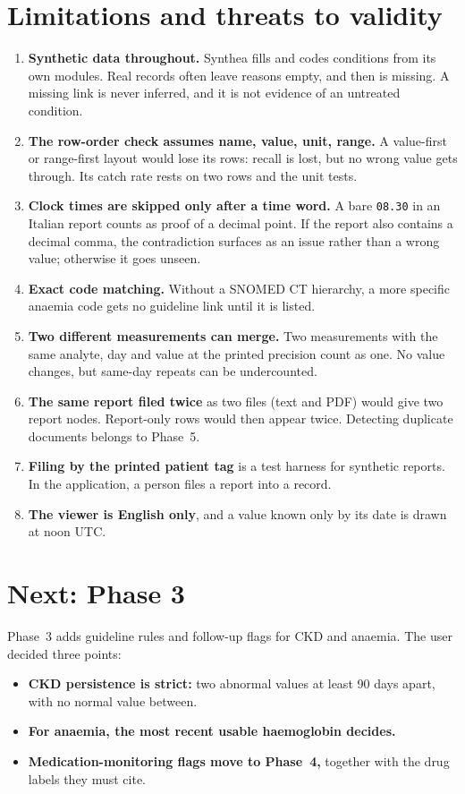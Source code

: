 \documentclass[11pt,a4paper]{article}
\newcommand{\code}[1]{\texttt{\detokenize{#1}}}
\begin{document}
\section{Limitations and threats to validity}
\begin{enumerate}
  \item \textbf{Synthetic data throughout.} Synthea fills \code{reasonReference} and codes conditions from its own modules. Real records often leave reasons empty, and then \code{treated_by} is missing. A missing link is never inferred, and it is not evidence of an untreated condition.
  \item \textbf{The row-order check assumes name, value, unit, range.} A value-first or range-first layout would lose its rows: recall is lost, but no wrong value gets through. Its catch rate rests on two rows and the unit tests.
  \item \textbf{Clock times are skipped only after a time word.} A bare \texttt{08.30} in an Italian report counts as proof of a decimal point. If the report also contains a decimal comma, the contradiction surfaces as an issue rather than a wrong value; otherwise it goes unseen.
  \item \textbf{Exact code matching.} Without a SNOMED CT hierarchy, a more specific anaemia code gets no guideline link until it is listed.
  \item \textbf{Two different measurements can merge.} Two measurements with the same analyte, day and value at the printed precision count as one. No value changes, but same-day repeats can be undercounted.
  \item \textbf{The same report filed twice} as two files (text and PDF) would give two report nodes. Report-only rows would then appear twice. Detecting duplicate documents belongs to Phase~5.
  \item \textbf{Filing by the printed patient tag} is a test harness for synthetic reports. In the application, a person files a report into a record.
  \item \textbf{The viewer is English only}, and a value known only by its date is drawn at noon UTC.
\end{enumerate}

\section{Next: Phase 3}
Phase~3 adds guideline rules and follow-up flags for CKD and anaemia. The user decided three points:
\begin{itemize}[nosep]
  \item \textbf{CKD persistence is strict:} two abnormal values at least 90 days apart, with no normal value between.
  \item \textbf{For anaemia, the most recent usable haemoglobin decides.}
  \item \textbf{Medication-monitoring flags move to Phase~4,} together with the drug labels they must cite.
\end{itemize}
\end{document}
